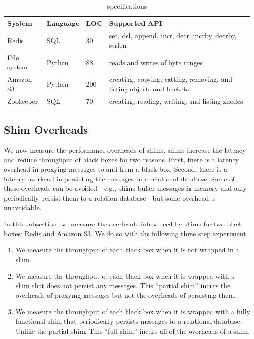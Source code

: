 \begin{table}[t]
  \caption{\fluent{} \watprovenance{} specifications}
  \begin{tabular}{lllp{3.9cm}}
    \toprule
    System      & Language & LOC & Supported API                                                         \\\midrule
    Redis       & SQL      & 30  & set, del, append, incr, decr, incrby, decrby, strlen                  \\
    File system & Python   & 88  & reads and writes of byte ranges                                       \\
    Amazon S3   & Python   & 200 & creating, copying, catting, removing, and listing objects and buckets \\
    Zookeeper   & SQL      & 70  & creating, reading, writing, and listing znodes                        \\
    \bottomrule
  \end{tabular}
\end{table}

\subsection{Shim Overheads}
We now measure the performance overheads of \fluent{} shims. \fluent{} shims
increase the latency and reduce throughput of black boxes for two reasons.
First, there is a latency overhead in proxying messages to and from a black
box. Second, there is a latency overhead in persisting the messages to a
relational database.  Some of these overheads can be avoided---e.g., \fluent{}
shims buffer messages in memory and only periodically persist them to a
relation database---but some overhead is unavoidable.

In this subsection, we measure the overheads introduced by \fluent{} shims for
two black boxes: Redis and Amazon S3. We do so with the following three step
experiment.
\begin{enumerate}
  \item
    We measure the throughput of each black box when it is not wrapped in a
    \fluent{} shim.
  \item
    We measure the throughput of each black box when it is wrapped with a
    \fluent{} shim that does not persist any messages. This ``partial shim''
    incurs the overheads of proxying messages but not the overheads of
    persisting them.
  \item
    We measure the throughput of each black box when it is wrapped with a fully
    functional \fluent{} shim that periodically persists messages to a
    relational database. Unlike the partial shim, This ``full shim'' incurs all
    of the overheads of a \fluent{} shim.
\end{enumerate}

